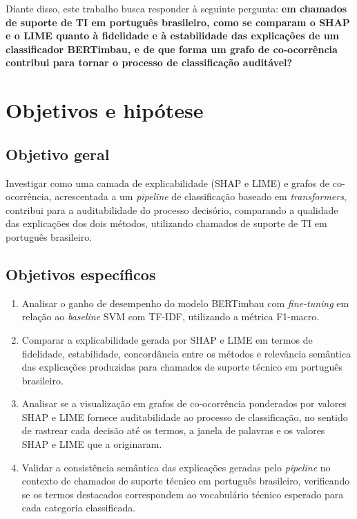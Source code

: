 \documentclass[
    12pt,                %
    openright,           %
    oneside,             %
    a4paper,             %
    english,             %
    brazil               %
]{abntex2}
\begin{document}
Diante disso, este trabalho busca responder à seguinte pergunta: 
\textbf{em chamados de suporte de TI em português brasileiro, como se comparam o 
SHAP e o LIME quanto à fidelidade e à estabilidade das explicações de um 
classificador BERTimbau, e de que forma um grafo de co-ocorrência contribui para 
tornar o processo de classificação auditável?}

\section{Objetivos e hipótese}

\subsection{Objetivo geral}
Investigar como uma camada de explicabilidade (SHAP e LIME) 
e grafos de co-ocorrência, acrescentada a um \textit{pipeline} 
de classificação baseado em \textit{transformers}, contribui 
para a auditabilidade do processo decisório, comparando a 
qualidade das explicações dos dois métodos, utilizando chamados 
de suporte de TI em português brasileiro.

\subsection{Objetivos específicos}
\begin{enumerate}
    \item Analisar o ganho de desempenho do modelo BERTimbau com 
    \textit{fine-tuning} em relação ao \textit{baseline} SVM com 
    TF-IDF, utilizando a métrica F1-macro.

    \item Comparar a explicabilidade gerada por SHAP e LIME em
    termos de fidelidade, estabilidade, concordância entre os
    métodos e relevância semântica das explicações produzidas
    para chamados de suporte técnico em português brasileiro.
    
    \item Analisar se a visualização em grafos de co-ocorrência
    ponderados por valores SHAP e LIME fornece auditabilidade
    ao processo de classificação, no sentido de
    rastrear cada decisão até os termos, a janela de palavras e
    os valores SHAP e LIME que a originaram.

    \item Validar a consistência semântica das explicações 
    geradas pelo \textit{pipeline} no contexto de chamados de 
    suporte técnico em português brasileiro, verificando se os 
    termos destacados correspondem ao vocabulário técnico 
    esperado para cada categoria classificada.
\end{enumerate}
\end{document}
